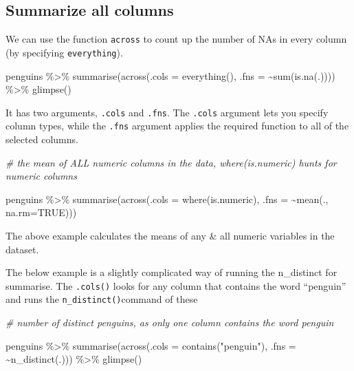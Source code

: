 \documentclass[
]{book}
\newenvironment{Shaded}{\begin{snugshade}}{\end{snugshade}}
\newcommand{\AttributeTok}[1]{\textcolor[rgb]{0.77,0.63,0.00}{#1}}
\newcommand{\CommentTok}[1]{\textcolor[rgb]{0.56,0.35,0.01}{\textit{#1}}}
\newcommand{\ConstantTok}[1]{\textcolor[rgb]{0.00,0.00,0.00}{#1}}
\newcommand{\FunctionTok}[1]{\textcolor[rgb]{0.00,0.00,0.00}{#1}}
\newcommand{\NormalTok}[1]{#1}
\newcommand{\SpecialCharTok}[1]{\textcolor[rgb]{0.00,0.00,0.00}{#1}}
\newcommand{\StringTok}[1]{\textcolor[rgb]{0.31,0.60,0.02}{#1}}
\begin{document}
\hypertarget{summarize-all-columns}{%
\subsection{Summarize all columns}\label{summarize-all-columns}}

We can use the function \texttt{across} to count up the number of NAs in every column (by specifying \texttt{everything}).

\begin{Shaded}
\begin{Highlighting}[]
\NormalTok{penguins }\SpecialCharTok{\%\textgreater{}\%} 
  \FunctionTok{summarise}\NormalTok{(}\FunctionTok{across}\NormalTok{(}\AttributeTok{.cols =} \FunctionTok{everything}\NormalTok{(), }
                   \AttributeTok{.fns =} \SpecialCharTok{\textasciitilde{}}\FunctionTok{sum}\NormalTok{(}\FunctionTok{is.na}\NormalTok{(.)))) }\SpecialCharTok{\%\textgreater{}\%} 
  \FunctionTok{glimpse}\NormalTok{()}
\end{Highlighting}
\end{Shaded}

It has two arguments, \texttt{.cols} and \texttt{.fns}. The \texttt{.cols} argument lets you specify column types, while the \texttt{.fns} argument applies the required function to all of the selected columns.

\begin{Shaded}
\begin{Highlighting}[]
\CommentTok{\# the mean of ALL numeric columns in the data, where(is.numeric) hunts for numeric columns}

\NormalTok{penguins }\SpecialCharTok{\%\textgreater{}\%} 
  \FunctionTok{summarise}\NormalTok{(}\FunctionTok{across}\NormalTok{(}\AttributeTok{.cols =} \FunctionTok{where}\NormalTok{(is.numeric), }
                   \AttributeTok{.fns =} \SpecialCharTok{\textasciitilde{}}\FunctionTok{mean}\NormalTok{(., }\AttributeTok{na.rm=}\ConstantTok{TRUE}\NormalTok{)))}
\end{Highlighting}
\end{Shaded}

The above example calculates the means of any \& all numeric variables in the dataset.

The below example is a slightly complicated way of running the n\_distinct for summarise. The \texttt{.cols()} looks for any column that contains the word ``penguin'' and runs the \texttt{n\_distinct()}command of these

\begin{Shaded}
\begin{Highlighting}[]
\CommentTok{\# number of distinct penguins, as only one column contains the word penguin}

\NormalTok{penguins }\SpecialCharTok{\%\textgreater{}\%} 
  \FunctionTok{summarise}\NormalTok{(}\FunctionTok{across}\NormalTok{(}\AttributeTok{.cols =} \FunctionTok{contains}\NormalTok{(}\StringTok{"penguin"}\NormalTok{), }
                   \AttributeTok{.fns =} \SpecialCharTok{\textasciitilde{}}\FunctionTok{n\_distinct}\NormalTok{(.))) }\SpecialCharTok{\%\textgreater{}\%} 
  \FunctionTok{glimpse}\NormalTok{()}
\end{Highlighting}
\end{Shaded}
\end{document}

